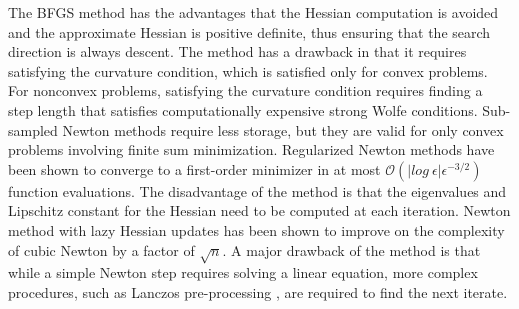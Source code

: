 \documentclass{elsarticle}
\numberwithin{equation}{section}
\begin{document}
The BFGS method has the advantages that the Hessian computation is avoided and the approximate Hessian is positive definite, thus ensuring that the search direction is always descent. The method has a drawback in that it requires satisfying the curvature condition, which is satisfied only for convex problems. For nonconvex problems, satisfying the curvature condition requires finding a step length that satisfies computationally expensive strong Wolfe conditions. Sub-sampled Newton methods require less storage, but they are valid for only convex problems involving finite sum minimization. Regularized Newton methods have been shown to converge to a first-order minimizer in at most $\mathcal{O}(|log\ \epsilon|\epsilon^{-3/2})$ function evaluations. The disadvantage of the method is that the eigenvalues and Lipschitz constant for the Hessian need to be computed at each iteration. Newton method with lazy Hessian updates has been shown to improve on the complexity of cubic Newton by a factor of $\sqrt{n}$. A major drawback of the method is that while a simple Newton step requires solving a linear equation, more complex procedures, such as Lanczos pre-processing \cite{cartis2011adaptive}, are required to find the next iterate.   
\end{document}
